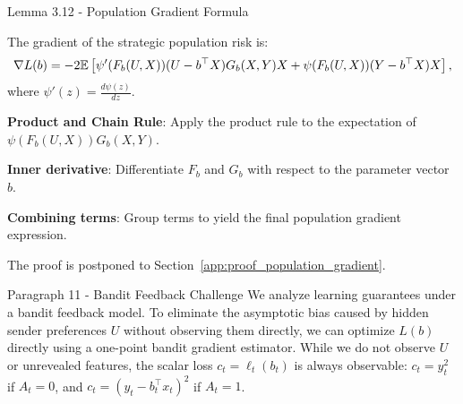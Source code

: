 \begin{faqblock}
\faqanswers
{}
\end{faqblock}

\begin{sourceblock}{Lemma 3.12 - Population Gradient Formula}
\begin{lemma}
\label{lem:population_gradient}
The gradient of the strategic population risk is:
\begin{equation}
    \label{eq:population_gradient}
    \nabla L(b) = -2 \mathbb{E}\left[ \psi'(F_b(U, X))(U - b^\top X) G_b(X, Y) X + \psi(F_b(U, X))(Y - b^\top X)X \right],
\end{equation}
where $\psi'(z) = \frac{d\psi(z)}{dz}$.
\end{lemma}
\end{sourceblock}

\begin{guideblock}
\item \textbf{Product and Chain Rule}: Apply the product rule to the expectation of $\psi(F_b(U, X)) G_b(X, Y)$.
\item \textbf{Inner derivative}: Differentiate $F_b$ and $G_b$ with respect to the parameter vector $b$.
\item \textbf{Combining terms}: Group terms to yield the final population gradient expression.
\end{guideblock}
The proof is postponed to Section~\ref{app:proof_population_gradient}.

\begin{sourceblock}{Paragraph 11 - Bandit Feedback Challenge}
We analyze learning guarantees under a bandit feedback model. To eliminate the asymptotic bias caused by hidden sender preferences $U$ without observing them directly, we can optimize $L(b)$ directly using a one-point bandit gradient estimator. While we do not observe $U$ or unrevealed features, the scalar loss $c_t = \ell_t(b_t)$ is always observable: $c_t = y_t^2$ if $A_t = 0$, and $c_t = (y_t - b_t^\top x_t)^2$ if $A_t = 1$.
\end{sourceblock}

\begin{faqblock}
\faqanswers
{}
\end{faqblock}

